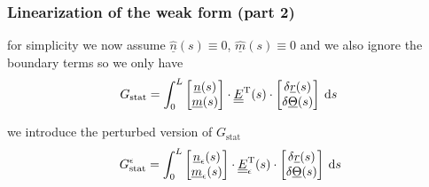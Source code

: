 \begin{frame}
  \frametitle{Linearization of the weak form (part 2)}
  
  for simplicity we now assume $\underline{\hat{n}}(s) \equiv 0$, $\underline{\hat{m}}(s) \equiv 0$ and we also ignore the boundary terms \newline
  so we only have   
  \begin{displaymath}
    G_{\text{stat}} = 
    \int_0^L
      \begin{bmatrix}
        \underline{n}(s) \\ \underline{m}(s)
      \end{bmatrix}
      \cdot \doubleunderline{E}^{\mathrm{T}}(s) \cdot
      \begin{bmatrix}
        \delta \underline{r}(s) \\ \delta \underline{\Theta}(s)
      \end{bmatrix}
    \: \dif s \:
  \end{displaymath}

  \vspace{0.5em}
  we introduce the perturbed version of $G_{\text{stat}}$
  \begin{displaymath}
    G_{\text{stat}}^{\epsilon} = 
    \int_0^L
      \begin{bmatrix}
        \underline{n}_{\epsilon}(s) \\ \underline{m}_{\epsilon}(s)
      \end{bmatrix}
      \cdot \doubleunderline{E}_{\epsilon}^{\mathrm{T}}(s) \cdot
      \begin{bmatrix}
        \delta \underline{r}(s) \\ \delta \underline{\Theta}(s)
      \end{bmatrix}
    \: \dif s %
  \end{displaymath}
  

\end{frame}
